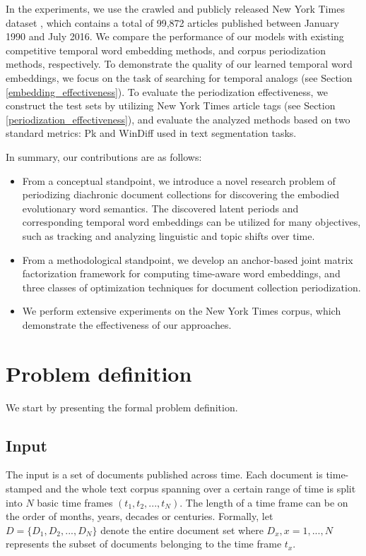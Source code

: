 \documentclass[output=paper]{langsci/langscibook}
\begin{document}
In the experiments, we use the crawled and publicly released New York Times dataset \citep{yao2018dynamic}, which contains a total of 99,872 articles published between January 1990 and July 2016. We compare the performance of our models with existing competitive temporal word embedding methods, and corpus periodization methods, respectively. 
To demonstrate the quality of our learned temporal word embeddings, we focus on the task of searching for temporal analogs (see Section \ref{embedding_effectiveness}).
To evaluate the periodization effectiveness, we construct the test sets by utilizing New York Times article tags (see Section \ref{periodization_effectiveness}), and evaluate the analyzed methods based on two standard metrics: Pk \citep{beeferman1999statistical} and WinDiff \citep{pevzner2002critique} used in text segmentation tasks.


In summary, our contributions are as follows:
\begin{itemize}
\item 
From a conceptual standpoint, we introduce a novel research problem of periodizing diachronic document collections for discovering the embodied evolutionary word semantics.
The discovered latent periods and corresponding temporal word embeddings can be utilized for many objectives, such as tracking and analyzing linguistic and topic shifts over time.
\item From a methodological standpoint, we develop an anchor-based joint matrix factorization framework for computing time-aware word embeddings, and three classes of optimization techniques for document collection periodization.
\item We perform extensive experiments on the New York Times corpus, which demonstrate the effectiveness of our approaches.
\end{itemize}

\section{Problem definition}\label{problem_definition}
We start by presenting the formal problem definition.

\subsection{Input} 
The input is a set of documents published across time. Each document is time-stamped and the whole text corpus spanning over a certain range of time is split into $N$ basic time frames $(t_{1}, t_{2}, ..., t_{N})$. The length of a time frame can be on the order of months, years, decades or centuries. Formally, let $D = \{D_{1}, D_{2}, ..., D_{N}\}$ denote the entire document set where $D_{x}, x = 1, ..., N$ represents the subset of documents belonging to the time frame $t_{x}$. 
\end{document}
